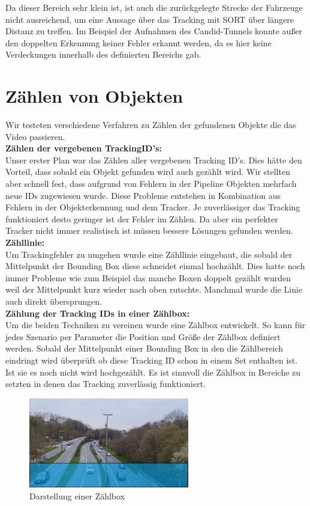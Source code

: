 \documentclass[conference]{IEEEtran}
\begin{document}
	Da dieser Bereich sehr klein ist, ist auch die zurückgelegte Strecke der Fahrzeuge nicht ausreichend, um eine Aussage über das Tracking mit SORT über längere Distanz zu treffen. 
	Im Beispiel der Aufnahmen des Candid-Tunnels konnte außer den doppelten Erkennung keiner Fehler erkannt werden, da es hier keine Verdeckungen innerhalb des definierten Bereichs gab.
	
	
	\section{Zählen von Objekten}
	Wir testeten verschiedene Verfahren zu Zählen der gefundenen Objekte die das Video passieren.\\
	\textbf{Zählen der vergebenen TrackingID's:}\\
	 Unser erster Plan war das Zählen aller vergebenen Tracking ID's. Dies hätte den Vorteil, dass sobald ein Objekt gefunden wird auch gezählt wird. Wir stellten aber schnell fest, dass aufgrund von Fehlern in der Pipeline Objekten mehrfach neue IDs zugewiesen wurde. Diese Probleme entstehen in Kombination aus Fehlern in der Objekterkennung und dem Tracker. Je zuverlässiger das Tracking funktioniert desto geringer ist der Fehler im Zählen. Da aber ein perfekter Tracker nicht immer realistisch ist müssen bessere Lösungen gefunden werden.\\
	\textbf{Zähllinie:}\\
	 Um Trackingfehler zu umgehen wurde eine Zähllinie eingebaut, die sobald der Mittelpunkt der Bounding Box diese schneidet einmal hochzählt. Dies hatte noch immer Probleme wie zum Beispiel das manche Boxen doppelt gezählt wurden weil der Mittelpunkt kurz wieder nach oben rutschte. Manchmal wurde die Linie auch direkt übersprungen.\\
	\textbf{Zählung der Tracking IDs in einer Zählbox:}\\
	 Um die beiden Techniken zu vereinen wurde eine Zählbox entwickelt. So kann für jedes Szenario per Parameter die Position und Größe der Zählbox definiert werden. Sobald der Mittelpunkt einer Bounding Box in den die Zählbereich eindringt wird überprüft ob diese Tracking ID schon in einem Set enthalten ist. Ist sie es noch nicht wird hochgezählt. Es ist sinnvoll die Zählbox in Bereiche zu setzten in denen das Tracking zuverlässig funktioniert. 
	\begin{figure}[!h]
		\begin{center}
			\includegraphics[width=7cm]{Media/BrudermuhlCounter.png}
			\caption{Darstellung einer Zählbox}
			\label{Counter}
		\end{center}
	\end{figure}
	
\end{document}
